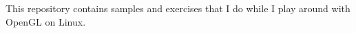 This repository contains samples and exercises that I do while I play around with Open\+GL on Linux. 